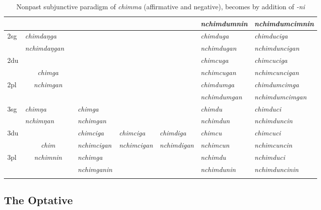 \begin{sidewaystable}
{{\begin{tabular}{l|p{2.4cm}|p{2.0cm}|p{2.6cm}|p{2.6cm}|p{2.6cm}|p{3.2cm}|p{3.2cm}}
		&  \multicolumn{2}{c|}{\cellcolor[gray]{.8} }& \multicolumn{3}{c|}{\cellcolor[gray]{.8} }& \it nchimdumnin & \it  nchimdumcimnin\\
\hline				
{\sc 2sg }		& \it 	chimdaŋga  & \it 	    &\multicolumn{3}{c|}{ \cellcolor[gray]{.8}}& \it  chimduga & \it    chimduciga\\
		& \it   nchimdaŋgan & \it   & \multicolumn{3}{c|}{\cellcolor[gray]{.8} }& \it  nchimdugan & \it nchimduncigan  \\
 \cline{1-2} \cline{7-8}			
{\sc 2du}		&	\multicolumn{2}{c|}{}     &  \multicolumn{3}{c|}{\cellcolor[gray]{.8}} & \it  chimcuga  & \it   chimcuciga \\
		& 	\multicolumn{2}{c|}{\it chimga} & \multicolumn{3}{c|}{\cellcolor[gray]{.8} }& \it nchimcugan  & \it  nchimcuncigan \\
 \cline{1-1} \cline{7-8}			
{\sc 2pl}		& 	\multicolumn{2}{c|}{\it nchimgan} &  \multicolumn{3}{c|}{ \cellcolor[gray]{.8}}& \it  chimdumga& \it  chimdumcimga  \\
		& 	\multicolumn{2}{c|}{ }& \multicolumn{3}{c|}{\cellcolor[gray]{.8} }& \it  nchimdumgan & \it  nchimdumcimgan \\
\hline			
{\sc 3sg} 		& \it chimŋa	  & \it 	      	& \it   chimga	 	& 	  &     	& \it chimdu& \it chimduci\\
		& \it  nchimŋan   & \it    	& \it nchimgan& \it  & \it    								& \it nchimdun& \it nchimduncin\\
  \cline{1-2}  \cline{4-4} \cline{7-8}					
{\sc 3du}& \multicolumn{2}{c|}{}&\it chimciga&\it chimciga& \it chimdiga& \it   chimcu & \it   chimcuci\\
	&  \multicolumn{2}{c|}{\it chim}	& \it nchimcigan		&   \it nchimcigan & \it  nchimdigan & \it  nchimcun & \it  nchimcuncin\\
 \cline{1-1} \cline{4-4} \cline{7-8}	
{\sc 3pl} & \multicolumn{2}{c|}{\it nchimnin}	& \it nchimga& \it  & \it  & \it nchimdu& \it nchimduci\\	
	& \multicolumn{2}{c|}{ }				& \it nchimganin& \it & \it  						& \it nchimdunin& \it nchimduncinin \\
\lspbottomrule
\end{tabular}
}
}
\caption{Nonpast subjunctive paradigm of \emph{chimma}  (affirmative and negative), becomes  by addition of \emph{-ni}}\label{par-chimd-sbjv}
\end{sidewaystable}
 
 
	
\subsection{The Optative}

